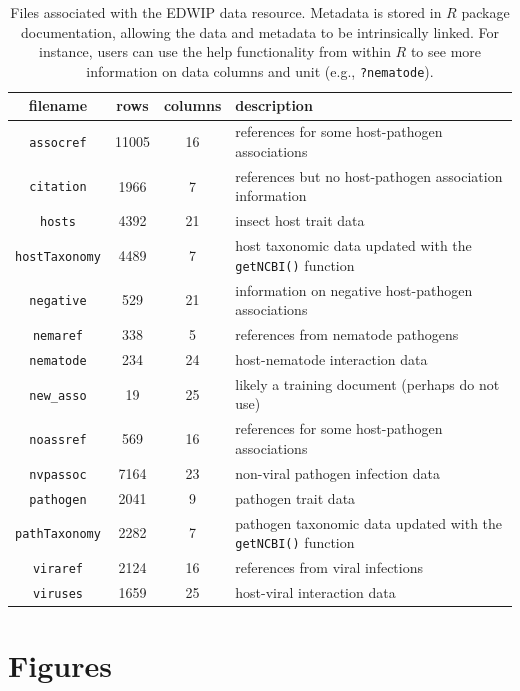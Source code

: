 \documentclass[12pt]{article}
\begin{document}
\begin{table}[ht]
\centering
\caption{Files associated with the EDWIP data resource. Metadata is stored in $R$ package documentation, allowing the data and metadata to be intrinsically linked. For instance, users can use the help functionality from within $R$ to see more information on data columns and unit (e.g., \texttt{?nematode}). }
\label{tab:data}
\begin{tabular}{cccp{8cm}}
  \hline
  filename & rows & columns & description \\
  \hline
   \texttt{assocref} & 11005  & 16 & references for some host-pathogen associations  \\
   \texttt{citation} & 1966  & 7  & references but no host-pathogen association information  \\
   \texttt{hosts} & 4392  & 21  & insect host trait data\\   
   \texttt{hostTaxonomy} & 4489  & 7  & host taxonomic data updated with the \texttt{getNCBI()} function \\
   \texttt{negative} & 529  & 21  & information on negative host-pathogen associations  \\
   \texttt{nemaref} & 338  & 5  & references from nematode pathogens  \\
   \texttt{nematode} & 234  & 24  & host-nematode interaction data \\   
   \texttt{new\_asso} & 19  & 25  & likely a training document (perhaps do not use)  \\ 
   \texttt{noassref} & 569  & 16  &  references for some host-pathogen associations  \\
   \texttt{nvpassoc} & 7164  & 23  & non-viral pathogen infection data  \\   
   \texttt{pathogen} & 2041  & 9  &  pathogen trait data  \\   
   \texttt{pathTaxonomy} & 2282  & 7  & pathogen taxonomic data updated with the \texttt{getNCBI()} function  \\
   \texttt{viraref} & 2124  & 16  & references from viral infections  \\   
   \texttt{viruses} & 1659  & 25  & host-viral interaction data  \\      
  \hline
\end{tabular}
\end{table}





\clearpage 


\section*{Figures}
\end{document}
